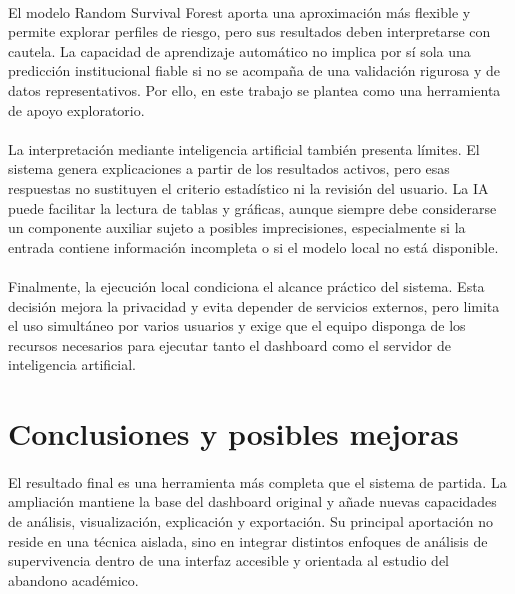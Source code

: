 \paragraph*{}El modelo Random Survival Forest aporta una aproximación más flexible y permite explorar perfiles de riesgo, pero sus resultados deben interpretarse con cautela. La capacidad de aprendizaje automático no implica por sí sola una predicción institucional fiable si no se acompaña de una validación rigurosa y de datos representativos. Por ello, en este trabajo se plantea como una herramienta de apoyo exploratorio.

\paragraph*{}La interpretación mediante inteligencia artificial también presenta límites. El sistema genera explicaciones a partir de los resultados activos, pero esas respuestas no sustituyen el criterio estadístico ni la revisión del usuario. La IA puede facilitar la lectura de tablas y gráficas, aunque siempre debe considerarse un componente auxiliar sujeto a posibles imprecisiones, especialmente si la entrada contiene información incompleta o si el modelo local no está disponible.

\paragraph*{}Finalmente, la ejecución local condiciona el alcance práctico del sistema. Esta decisión mejora la privacidad y evita depender de servicios externos, pero limita el uso simultáneo por varios usuarios y exige que el equipo disponga de los recursos necesarios para ejecutar tanto el dashboard como el servidor de inteligencia artificial.

\section{Conclusiones y posibles mejoras}

\paragraph*{}El resultado final es una herramienta más completa que el sistema de partida. La ampliación mantiene la base del dashboard original y añade nuevas capacidades de análisis, visualización, explicación y exportación. Su principal aportación no reside en una técnica aislada, sino en integrar distintos enfoques de análisis de supervivencia dentro de una interfaz accesible y orientada al estudio del abandono académico.

